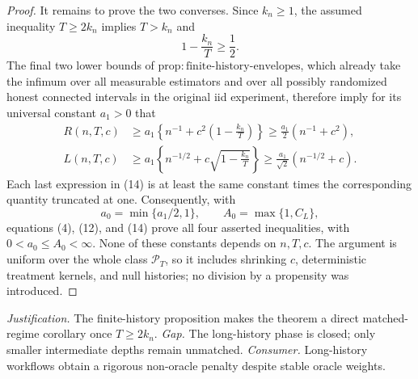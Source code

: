 \documentclass{article}
\begin{document}
\begin{proof}
It remains to prove the two converses.  Since \(k_n\geq1\), the assumed inequality \(T\geq2k_n\) implies \(T>k_n\) and
\[
1-\frac{k_n}{T}\geq\frac12.
\tag{13}
\]
The final two lower bounds of \(\mathrm{prop:finite\text{-}history\text{-}envelopes}\), which already take the infimum over all measurable estimators and over all possibly randomized honest connected intervals in the original iid experiment, therefore imply for its universal constant \(a_1>0\) that
\[
\begin{aligned}
R(n,T,c)
&\geq a_1\left\{n^{-1}+c^2\left(1-\frac{k_n}{T}\right)\right\}
\geq\frac{a_1}{2}(n^{-1}+c^2),\\
L(n,T,c)
&\geq a_1\left\{n^{-1/2}+c\sqrt{1-\frac{k_n}{T}}\right\}
\geq\frac{a_1}{\sqrt2}(n^{-1/2}+c).
\end{aligned}
\tag{14}
\]
Each last expression in (14) is at least the same constant times the corresponding quantity truncated at one.  Consequently, with
\[
a_0=\min\{a_1/2,1\},
\qquad
A_0=\max\{1,C_L\},
\tag{15}
\]
equations (4), (12), and (14) prove all four asserted inequalities, with \(0<a_0\leq A_0<\infty\).  None of these constants depends on \(n,T,c\).  The argument is uniform over the whole class \(\mathcal P_T\), so it includes shrinking \(c\), deterministic treatment kernels, and null histories; no division by a propensity was introduced.
\end{proof}
\par\smallskip\noindent \textit{Justification.} The finite-history proposition makes the theorem a direct matched-regime corollary once \(T\geq2k_n\). \textit{Gap.} The long-history phase is closed; only smaller intermediate depths remain unmatched. \textit{Consumer.} Long-history workflows obtain a rigorous non-oracle penalty despite stable oracle weights.
\end{document}
